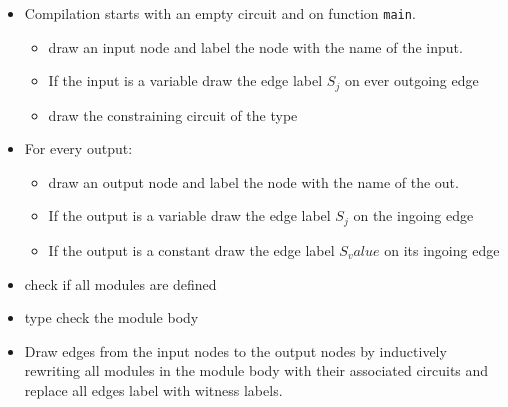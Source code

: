 \begin{itemize}
\item Compilation starts with an empty circuit and on function \texttt{main}.
\begin{itemize}
\item  draw an input node and label the node with the name of the input.
\item If the input is a variable draw the edge label $S_j$ on ever outgoing edge
\item draw the constraining circuit of the type
\end{itemize}
\item For every output:
\begin{itemize}
\item  draw an output node and label the node with the name of the out.
\item If the output is a variable draw the edge label $S_j$ on the ingoing edge
\item If the output is a constant draw the edge label $S_value$ on its ingoing edge
\end{itemize}
\item check if all modules are defined
\item type check the module body 
\item Draw edges from the input nodes to the output nodes by inductively rewriting all modules in the module body with their associated circuits and replace all edges label with witness labels.
\end{itemize}
